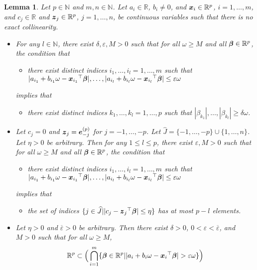 \documentclass[12pt]{article}
\newtheorem{lem}{Lemma}
\def\ep{{\varepsilon}}
\def\be{{\beta}}
\def\de{{\delta}}
\def\ep{{\varepsilon}}
\def\om{{\omega}}
\def\non{{\nonumber}}
\def\be{{\beta}}
\def\de{{\delta}}
\def\ep{{\varepsilon}}
\def\om{{\omega}}
\def\bbe{{\text{\boldmath $\beta$}}}
\def\e{{\text{\boldmath $e$}}}
\def\x{{\text{\boldmath $x$}}}
\def\z{{\text{\boldmath $z$}}}
\def\Jh{{\widehat J}}
\def\non{{\nonumber}}
\begin{document}
\begin{lem}
\label{lem:Linear} 
Let $p \in \mathbb{N}$ and $m, n \in \mathbb{N}$. 
Let $a_i \in \mathbb{R}$, $b_i \neq 0$, and $\x _i \in \mathbb{R} ^p$, $i = 1, \dots , m$, and $c_j \in \mathbb{R}$ and $\z _j \in \mathbb{R} ^p$, $j = 1, \dots , n$, be continuous variables such that there is no exact collinearity. 
\begin{itemize}
\item[{\rm{(i)}}]
For any $l \in \mathbb{N}$, there exist $\de , \ep , M > 0$ such that for all $\om \ge M$ and all $\bbe \in \mathbb{R} ^p$, the condition that 
\begin{itemize}
\item
there exist distinct indices $i_1 , \dots , i_l = 1, \dots , m$ such that $| a_{i_1} + b_{i_1} \om - {\x _{i_1}}^{\top } \bbe |, \dots , | a_{i_l} + b_{i_l} \om - {\x _{i_l}}^{\top } \bbe | \le \ep \om $ 
\end{itemize}
implies that 
\begin{itemize}
\item
there exist distinct indices $k_1 , \dots , k_l = 1, \dots , p$ such that $| \be _{k_1} |, \dots , | \be _{k_l} | \ge \de \om $. 
\end{itemize}
\item[{\rm{(ii)}}]
Let $c_j = 0$ and $\z _j = \e _{- j}^{(p)}$ for $j = - 1, \dots , - p$. 
Let $\Jh = \{ - 1, \dots , - p \} \cup \{ 1, \dots , n \} $. 
Let $\eta > 0$ be arbitrary. 
Then for any $1 \le l \le p$, there exist $\ep , M > 0$ such that for all $\om \ge M$ and all $\bbe \in \mathbb{R} ^p$, the condition that 
\begin{itemize}
\item
there exist distinct indices $i_1 , \dots , i_l = 1, \dots , m$ such that $| a_{i_1} + b_{i_1} \om - {\x _{i_1}}^{\top } \bbe |, \dots , | a_{i_l} + b_{i_l} \om - {\x _{i_l}}^{\top } \bbe | \le \ep \om $ 
\end{itemize}
implies that 
\begin{itemize}
\item
the set of indices $\{ j \in \Jh | | c_j - {\z _j}^{\top } \bbe | \le \eta \} $ has at most $p - l$ elements. 
\end{itemize}
\item[{\rm{(iii)}}]
Let $\eta > 0$ and $\overline{\ep } > 0$ be arbitrary. 
Then there exist $\de > 0$, $0 < \ep < \overline{\ep }$, and $M > 0$ such that for all $\om \ge M$, 
\begin{align}
\mathbb{R} ^p &\subset \Big( \bigcap_{i = 1}^{m} \{ \bbe \in \mathbb{R} ^p | | a_i + b_i \om - {\x _i}^{\top } \bbe | > \ep \om \} \Big) \non \\

\end{align}
\end{itemize}
\end{lem}
\end{document}
